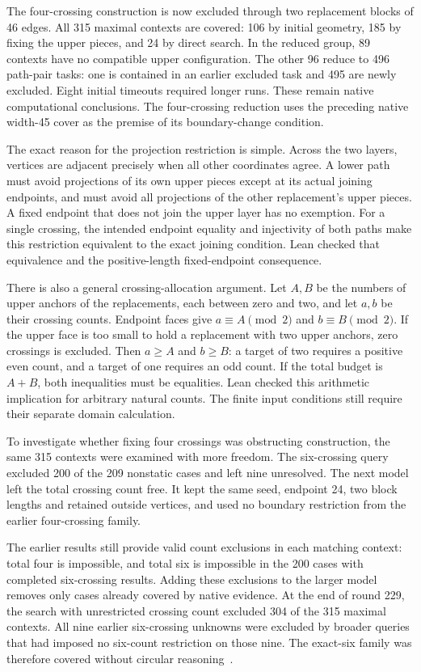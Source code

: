 \documentclass[11pt,a4paper]{article}
\begin{document}
The four-crossing construction is now excluded through two replacement
blocks of 46 edges. All 315 maximal contexts are covered: 106 by initial
geometry, 185 by fixing the upper pieces, and 24 by direct search. In
the reduced group, 89 contexts have no compatible upper configuration.
The other 96 reduce to 496 path-pair tasks: one is contained in an earlier
excluded task and 495 are newly excluded. Eight initial timeouts required
longer runs. These remain native computational conclusions. The
four-crossing reduction uses the preceding native width-45 cover as the
premise of its boundary-change condition.

The exact reason for the projection restriction is simple. Across the
two layers, vertices are adjacent precisely when all other coordinates
agree. A lower path must avoid projections of its own upper pieces
except at its actual joining endpoints, and must avoid all projections
of the other replacement's upper pieces. A fixed endpoint that does not
join the upper layer has no exemption. For a single crossing,
the intended endpoint equality and injectivity of both paths make this
restriction equivalent to the exact joining condition. Lean checked
that equivalence and the positive-length fixed-endpoint consequence.

There is also a general crossing-allocation argument. Let $A,B$ be the
numbers of upper anchors of the replacements, each between zero and two,
and let $a,b$ be their crossing counts. Endpoint faces give
$a\equiv A\pmod2$ and $b\equiv B\pmod2$. If the upper face is too small
to hold a replacement with two upper anchors, zero crossings is excluded.
Then $a\ge A$ and $b\ge B$: a target of two requires a positive even
count, and a target of one requires an odd count. If the total budget
is $A+B$, both inequalities must be equalities. Lean checked this
arithmetic implication for arbitrary natural counts. The finite input
conditions still require their separate domain calculation.

To investigate whether fixing four crossings was obstructing construction,
the same 315 contexts were examined with more freedom. The six-crossing
query excluded 200 of the 209 nonstatic cases and left nine unresolved.
The next model left the total crossing count free. It kept the same
seed, endpoint 24, two block lengths and retained outside vertices, and
used no boundary restriction from the earlier four-crossing family.

The earlier results still provide valid count exclusions in each matching
context: total four is impossible, and total six is impossible in the
200 cases with completed six-crossing results. Adding these exclusions
to the larger model removes only cases already covered by native evidence.
At the end of round 229, the search with unrestricted crossing count
excluded 304 of the 315 maximal contexts. All nine earlier six-crossing
unknowns were excluded by broader queries that had imposed no six-count
restriction on those nine. The exact-six family was therefore covered
without circular reasoning~\cite{research229}.
\end{document}
